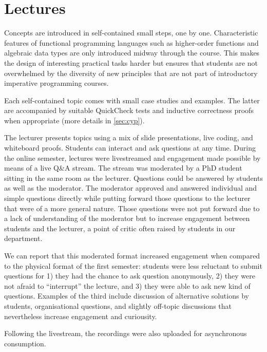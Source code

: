 \section{Lectures}\label{sec:lectures}

Concepts are introduced in self-contained small steps, one by one.
Characteristic features of functional programming languages such as
higher-order functions and algebraic data types are
only introduced midway through the course.
This makes the design of interesting practical tasks harder
but ensures that students are not overwhelmed by the diversity
of new principles that are not part of introductory imperative programming courses.

Each self-contained topic comes with small case studies and examples.
The latter are accompanied by suitable QuickCheck tests
and inductive correctness proofs when appropriate (more details in \cref{sec:cyp}).

The lecturer presents topics using a mix of
slide presentations,
live coding, and whiteboard proofs.
Students can interact and ask questions at any time.
During the online semester,
lectures were livestreamed and
engagement made possible by means of a live Q\&A stream.
The stream was moderated by a PhD student
sitting in the same room as the lecturer.
Questions could be answered by students as well as the moderator.
The moderator approved and answered individual and simple questions directly while putting forward those questions to the lecturer
that were of a more general nature.
Those questions were not put forward due to a lack of understanding of the moderator
but to increase engagement between students and the lecturer,
a point of critic often raised by students in our department.

We can report that this moderated format increased engagement when compared to the physical format of the first semester:
students were less reluctant to submit questions for
1) they had the chance to ask question anonymously,
2) they were not afraid to ``interrupt'' the lecture, and
3) they were able to ask new kind of questions.
Examples of the third include discussion of alternative solutions by students,
organisational questions,
and slightly off-topic discussions that nevertheless increase engagement and curiousity.

Following the livestream,
the recordings were also uploaded for asynchronous consumption.


